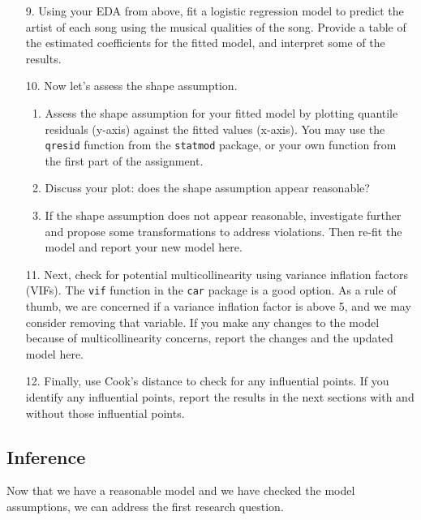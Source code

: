 \documentclass[11pt]{article}
\begin{document}
\begin{enumerate}
\item[9.] Using your EDA from above, fit a logistic regression model to predict the artist of each song using the musical qualities of the song. Provide a table of the estimated coefficients for the fitted model, and interpret some of the results.

\item[10.] Now let's assess the shape assumption.

\begin{enumerate}
\item Assess the shape assumption for your fitted model by plotting quantile residuals (y-axis) against the fitted values (x-axis). You may use the \texttt{qresid} function from the \texttt{statmod} package, or your own function from the first part of the assignment.

\item Discuss your plot: does the shape assumption appear reasonable?

\item If the shape assumption does not appear reasonable, investigate further and propose some transformations to address violations. Then re-fit the model and report your new model here.
\end{enumerate}

\item[11.] Next, check for potential multicollinearity using variance inflation factors (VIFs). The \texttt{vif} function in the \texttt{car} package is a good option. As a rule of thumb, we are concerned if a variance inflation factor is above 5, and we may consider removing that variable. If you make any changes to the model because of multicollinearity concerns, report the changes and the updated model here.

\item[12.] Finally, use Cook's distance to check for any influential points. If you identify any influential points, report the results in the next sections with and without those influential points.

\end{enumerate}

\subsection*{Inference}

Now that we have a reasonable model and we have checked the model assumptions, we can address the first research question.
\end{document}

